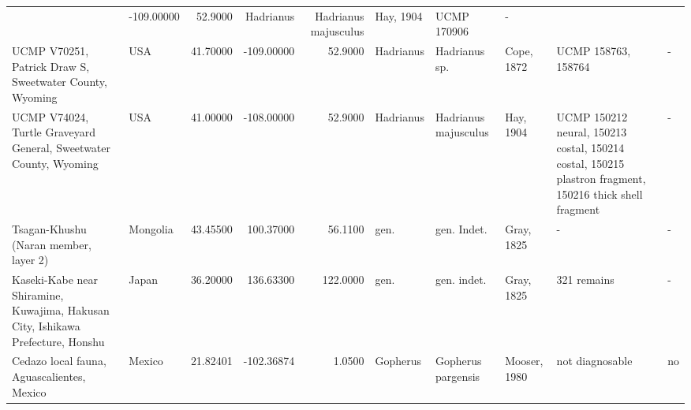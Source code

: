 \begin{landscape}
{\begin{longtable}[]{@{}llrrrlllll@{}}
& -109.00000 & 52.9000 & Hadrianus & Hadrianus majusculus & Hay, 1904 &
UCMP 170906 & -\tabularnewline
UCMP V70251, Patrick Draw S, Sweetwater County, Wyoming & USA & 41.70000
& -109.00000 & 52.9000 & Hadrianus & Hadrianus sp. & Cope, 1872 & UCMP
158763, 158764 & -\tabularnewline
UCMP V74024, Turtle Graveyard General, Sweetwater County, Wyoming & USA
& 41.00000 & -108.00000 & 52.9000 & Hadrianus & Hadrianus majusculus &
Hay, 1904 & UCMP 150212 neural, 150213 costal, 150214 costal, 150215
plastron fragment, 150216 thick shell fragment & -\tabularnewline
Tsagan-Khushu (Naran member, layer 2) & Mongolia & 43.45500 & 100.37000
& 56.1100 & gen. & gen. Indet. & Gray, 1825 & - & -\tabularnewline
Kaseki-Kabe near Shiramine, Kuwajima, Hakusan City, Ishikawa Prefecture,
Honshu & Japan & 36.20000 & 136.63300 & 122.0000 & gen. & gen. indet. &
Gray, 1825 & 321 remains & -\tabularnewline
Cedazo local fauna, Aguascalientes, Mexico & Mexico & 21.82401 &
-102.36874 & 1.0500 & Gopherus & Gopherus pargensis & Mooser, 1980 & not
diagnosable & no\tabularnewline
\bottomrule
\end{longtable}
}

\end{landscape}